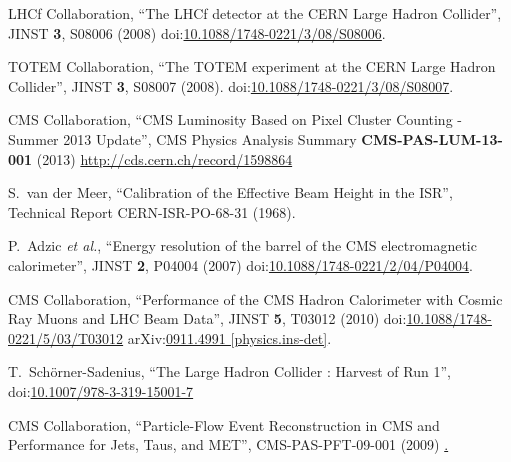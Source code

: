 \begin{thebibliography}{99}
LHCf Collaboration, ``The LHCf detector at the CERN Large Hadron Collider'', JINST {\bf 3}, S08006 (2008) doi:\href{http://dx.doi.org/10.1088/1748-0221/3/08/S08006}{10.1088/1748-0221/3/08/S08006}.

TOTEM Collaboration, ``The TOTEM experiment at the CERN Large Hadron Collider'', JINST {\bf 3}, S08007 (2008). doi:\href{http://dx.doi.org/10.1088/1748-0221/3/08/S08007}{10.1088/1748-0221/3/08/S08007}.

CMS Collaboration, ``CMS Luminosity Based on Pixel Cluster Counting - Summer 2013 Update'', CMS Physics Analysis Summary {\bf CMS-PAS-LUM-13-001} (2013) \url{http://cds.cern.ch/record/1598864}

S.~van der Meer, ``Calibration of the Effective Beam Height in the ISR'', Technical Report CERN-ISR-PO-68-31 (1968).

  
    
P.~Adzic {\it et al.}, ``Energy resolution of the barrel of the CMS electromagnetic calorimeter'', JINST {\bf 2}, P04004 (2007) doi:\href{http://dx.doi.org/10.1088/1748-0221/2/04/P04004}{10.1088/1748-0221/2/04/P04004}. 

CMS Collaboration, ``Performance of the CMS Hadron Calorimeter with Cosmic Ray Muons and LHC Beam Data'', JINST {\bf 5}, T03012 (2010) doi:\href{http://dx.doi.org/10.1088/1748-0221/5/03/T03012}{10.1088/1748-0221/5/03/T03012} arXiv:\href{https://arxiv.org/abs/0911.4991}{0911.4991 [physics.ins-det]}.

T.~Schörner-Sadenius, ``The Large Hadron Collider : Harvest of Run 1'', doi:\href{http://dx.doi.org/10.1007/978-3-319-15001-7}{10.1007/978-3-319-15001-7}



CMS Collaboration, ``Particle-Flow Event Reconstruction in CMS and Performance for Jets, Taus, and MET'', CMS-PAS-PFT-09-001 (2009) \href{http://cds.cern.ch/record/1194487}.


\end{thebibliography}

